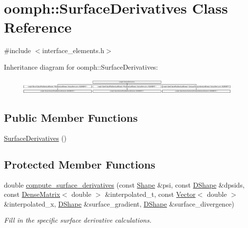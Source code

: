 \hypertarget{classoomph_1_1SurfaceDerivatives}{}\section{oomph\+:\+:Surface\+Derivatives Class Reference}
\label{classoomph_1_1SurfaceDerivatives}


{\ttfamily \#include $<$interface\+\_\+elements.\+h$>$}

Inheritance diagram for oomph\+:\+:Surface\+Derivatives\+:\begin{figure}[H]
\begin{center}
\leavevmode
\includegraphics[height=0.834575cm]{classoomph_1_1SurfaceDerivatives}
\end{center}
\end{figure}
\subsection*{Public Member Functions}
\begin{DoxyCompactItemize}
\item 
\hyperlink{classoomph_1_1SurfaceDerivatives_a7bd520c805a4444073f5b05501d747fd}{Surface\+Derivatives} ()
\end{DoxyCompactItemize}
\subsection*{Protected Member Functions}
\begin{DoxyCompactItemize}
\item 
double \hyperlink{classoomph_1_1SurfaceDerivatives_a44e841bfa4ad82dcb87e672c821ffde7}{compute\+\_\+surface\+\_\+derivatives} (const \hyperlink{classoomph_1_1Shape}{Shape} \&psi, const \hyperlink{classoomph_1_1DShape}{D\+Shape} \&dpsids, const \hyperlink{classoomph_1_1DenseMatrix}{Dense\+Matrix}$<$ double $>$ \&interpolated\+\_\+t, const \hyperlink{classoomph_1_1Vector}{Vector}$<$ double $>$ \&interpolated\+\_\+x, \hyperlink{classoomph_1_1DShape}{D\+Shape} \&surface\+\_\+gradient, \hyperlink{classoomph_1_1DShape}{D\+Shape} \&surface\+\_\+divergence)
\begin{DoxyCompactList}\small\item\em Fill in the specific surface derivative calculations. \end{DoxyCompactList}\end{DoxyCompactItemize}


